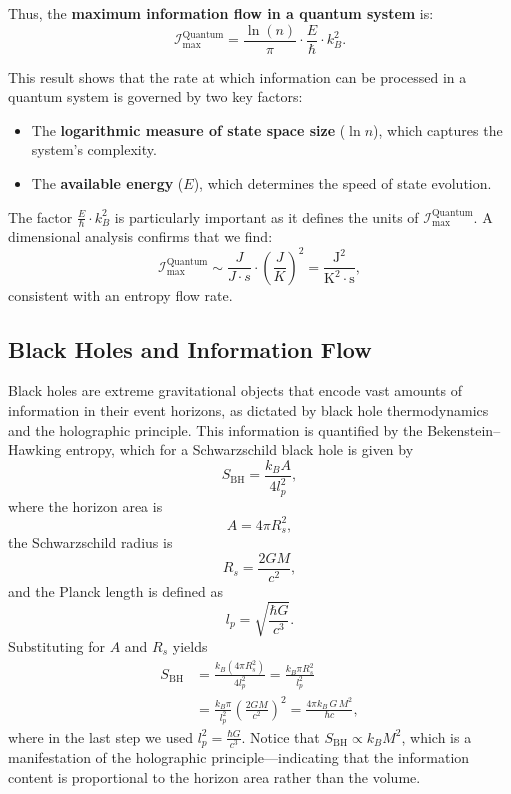 \documentclass[12pt]{article}
\begin{document}
Thus, the \textbf{maximum information flow in a quantum system} is:
\begin{equation}
    \mathcal{I}_{\text{max}}^{\text{Quantum}} = \frac{\ln(n)}{\pi} \cdot \frac{E}{\hbar} \cdot k_B^2.
\end{equation}

This result shows that the rate at which information can be processed in a quantum system is governed by two key factors:
\begin{itemize}
    \item The \textbf{logarithmic measure of state space size} (\(\ln n\)), which captures the system’s complexity.
    \item The \textbf{available energy} (\(E\)), which determines the speed of state evolution.
\end{itemize}

The factor $\frac{E}{\hbar} \cdot k_B^2$ is particularly important as it defines the units of $\mathcal{I}_{\text{max}}^{\text{Quantum}}$. A dimensional analysis confirms that we find:
\begin{equation}
    \mathcal{I}_{\text{max}}^{\text{Quantum}} \sim \frac{J}{J \cdot s} \cdot (\frac{J}{K})^2 = \frac{\text{J}^2}{\text{K}^2 \cdot \text{s}},
\end{equation}
consistent with an entropy flow rate.


\subsection{Black Holes and Information Flow}  

Black holes are extreme gravitational objects that encode vast amounts of information in their event horizons, as dictated by black hole thermodynamics and the holographic principle. This information is quantified by the Bekenstein–Hawking entropy, which for a Schwarzschild black hole is given by
\begin{equation}
    S_{\text{BH}} = \frac{k_B A}{4l_p^2},
\end{equation}
where the horizon area is 
\begin{equation}
    A = 4\pi R_s^2,
\end{equation}
the Schwarzschild radius is 
\begin{equation}
    R_s = \frac{2GM}{c^2},
\end{equation}
and the Planck length is defined as 
\begin{equation}
    l_p = \sqrt{\frac{\hbar G}{c^3}}.
\end{equation}
Substituting for \(A\) and \(R_s\) yields
\begin{align}
    S_{\text{BH}} &= \frac{k_B (4\pi R_s^2)}{4l_p^2} 
    = \frac{k_B \pi R_s^2}{l_p^2}  \nonumber \\
    &= \frac{k_B \pi}{l_p^2}\left(\frac{2GM}{c^2}\right)^2 
    = \frac{4\pi k_B\, G\, M^2}{\hbar c},
\end{align}
where in the last step we used \(l_p^2=\frac{\hbar G}{c^3}\). Notice that \(S_{\text{BH}} \propto k_B M^2\), which is a manifestation of the holographic principle—indicating that the information content is proportional to the horizon area rather than the volume.
\end{document}

